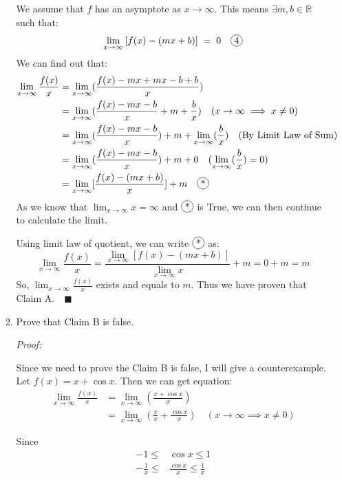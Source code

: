 \documentclass[12pt]{exam}
\newcommand*\circled[1]{\tikz[baseline=(char.base)]{
    \node[shape=circle, draw, inner sep=1pt, 
        minimum height=12pt] (char) {#1};}}
\newcommand{\vv}{\vspace{.1cm}}
\newcommand{\R}{\mathbb{R}}
\begin{document}
\begin{enumerate}
\begin{enumerate}
		We assume that $f$ has an asymptote as $x \to \infty$. This means $\exists m,b\in\R$ such that:
		$$
		    \lim_{x \to \infty} \left[ f(x) - \left( mx + b \right) \right] \; = \; 0 \quad\circled{4}
		$$
		We can find out that:
		\begin{align*}
		    \lim_{x \to \infty} \frac{f(x)}{x}
		    &=\lim_{x \to \infty} (\frac{f(x)-mx+mx-b+b}{x})\\
		    &=\lim_{x \to \infty} (\frac{f(x)-mx-b}{x}+m+\frac{b}{x}) \quad (x \to \infty \implies x \neq 0)\\
		    &=\lim_{x \to \infty}(\frac{f(x)-mx-b}{x})+m+\lim_{x \to \infty}(\frac{b}{x}) \quad(\mbox{By Limit Law of Sum})\\
		    &=\lim_{x \to \infty}(\frac{f(x)-mx-b}{x})+m+0\quad(\lim_{x \to \infty}(\frac{b}{x})=0)\\
		    &=\lim_{x \to \infty}[\frac{f(x)-(mx+b)}{x}]+m \quad \circled{*}
		\end{align*}
		As we know that $\lim_{x \to \infty}x=\infty$ and $\circled{*}$ is True, we can then continue to calculate the limit. 
		
		Using limit law of quotient, we can write $\circled{*}$ as:
		$$
		    \lim_{x \to \infty} \frac{f(x)}{x}=\frac{\lim_{x \to \infty}[f(x)-(mx+b)]}{\lim_{x \to \infty}x}+m=0+m=m
		$$
		So, $\lim_{x \to \infty} \frac{f(x)}{x}$ exists and equals to $m$. Thus we have proven that Claim A.$\quad\blacksquare$
		
		\newpage
		
		\item Prove that Claim B is false.
		
		\vv
		
		\emph{Proof:}
		
		\vv
		
		Since we need to prove the Claim B is false, I will give a counterexample. Let $f(x)=x+\cos{x}.$
		Then we can get equation:
		\begin{align*}
		    \lim_{x \to \infty} \frac{f(x)}{x}&=\lim_{x \to \infty}(\frac{x+\cos{x}}{x}) \\
		    &=\lim_{x \to \infty}(\frac{x}{x}+\frac{\cos{x}}{x})\quad (x \to \infty \implies x \neq 0)
		\end{align*}
		
		Since
		\begin{align*}
		    -1\leq&\cos{x}\leq1\\
		    -\frac{1}{x}\leq&\frac{\cos{x}}{x}\leq\frac{1}{x}
		\end{align*}
		

\end{enumerate}
\end{enumerate}
\end{document}
